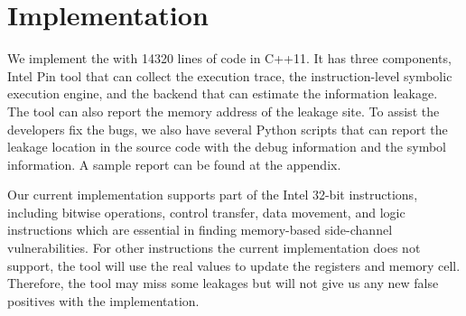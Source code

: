 \section{Implementation}
We implement the \tool{} with 14320 lines of code in C++11. 
It has three components, Intel
Pin tool that can collect the execution trace, 
the instruction-level symbolic execution
engine, and the backend that can estimate the information leakage. 
The tool can also report the memory address of the leakage site. 
To assist the developers fix the bugs,
we also have several Python scripts that can report the leakage 
location in the source code with the debug information and the symbol 
information. A sample report can be found at the appendix.

\begin{table}[h]
    \centering
    \caption{\tool{}'s main components and their LoC}
\end{table}

Our current implementation supports part of the Intel 32-bit instructions, 
including bitwise operations, control transfer, data movement, and logic 
instructions which are essential in finding memory-based side-channel 
vulnerabilities. For other 
instructions the current implementation does not support, 
the tool will use the real values to update the registers and memory cell.
Therefore, the tool may miss some leakages but will not give us any new
false positives with the implementation.
